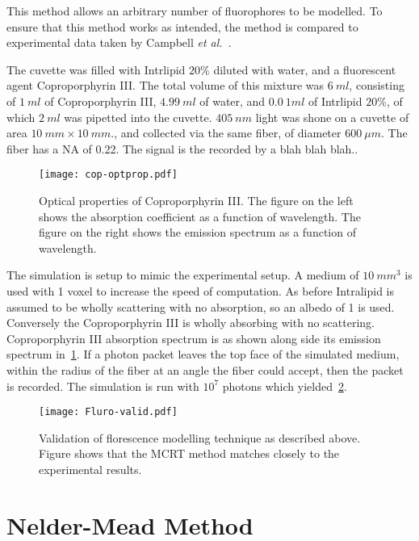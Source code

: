 This method allows an arbitrary number of fluorophores to be modelled.
To ensure that this method works as intended, the method is compared to experimental data taken by Campbell \textit{et al.}~\cite{louisethesis}.

The cuvette was filled with Intrlipid $20\%$ diluted with water, and a fluorescent agent Coproporphyrin III\@.
The total volume of this mixture was $6~ml$, consisting of $1~ml$ of Coproporphyrin III, $4.99~ml$ of water, and $0.0~1ml$ of Intrlipid $20\%$, of which $2~ml$ was pipetted into the cuvette.
$405~nm$ light was shone on a cuvette of area $10~mm \times 10~mm$., and collected via the same fiber, of diameter $600~\mu m$.
The fiber has a NA of 0.22.
The signal is the recorded by a blah blah blah..

\begin{figure}[!htpb]
	\centering
	\texttt{[image: cop-optprop.pdf]}
	\caption{Optical properties of Coproporphyrin III. The figure on the left shows the absorption coefficient as a function of wavelength. The figure on the right shows the emission spectrum as a function of wavelength.}
	\label{fig:coporiii}
\end{figure}

The simulation is setup to mimic the experimental setup.
A medium of $10~mm^3$ is used with 1 voxel to increase the speed of computation.
As before Intralipid is assumed to be wholly scattering with no absorption, so an albedo of 1 is used.
Conversely the Coproporphyrin III is wholly absorbing with no scattering.
Coproporphyrin III absorption spectrum is as shown along side its emission spectrum in~\cref{fig:coporiii}.
If a photon packet leaves the top face of the simulated medium, within the radius of the fiber at an angle the fiber could accept, then the packet is recorded.
The simulation is run with $10^7$ photons which yielded~\cref{fig:flurovalid}.

\begin{figure}[!htpb]
  \centering
  \texttt{[image: Fluro-valid.pdf]}
  \caption{Validation of florescence modelling technique as described above. Figure shows that the MCRT method matches closely to the experimental results.}
  \label{fig:flurovalid}
\end{figure}

\FloatBarrier

\section{Nelder-Mead Method}

